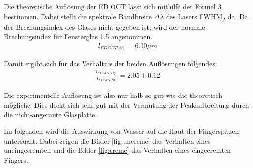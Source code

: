\documentclass[german, %
parskip=full, %
bibliography=totoc, %
]{scrartcl}
\begin{document}
Die theoretische Auflösung der FD OCT lässt sich mithilfe der Formel 3 bestimmen. Dabei stellt die spektrale Bandbreite $\Delta \lambda$ des Lasers FWHM\textsubscript{$\lambda$} da. Da der Brechungsindex des Glases nicht gegeben ist, wird der normale Brechungsindex für Fensterglas 1.5 angenommen. 
\begin{align*}
l_{FD OCT; th.} = 6.00 \mu m
\end{align*}

Damit ergibt sich für das Verhältnis der beiden Auflösungen folgendes:
\begin{align*}
\frac{l_{FD OCT; exp.}}{l_{FD OCT; th.}} = 2.05 \pm 0.12
\end{align*}

Die experimentelle Auflösung ist also nur halb so gut wie die theoretisch mögliche. Dies deckt sich sehr gut mit der Vermutung der Peakaufbreitung durch die nicht-angeraute Glasplatte. 

Im folgenden wird die Auswirkung von Wasser auf die Haut der Fingerspitzen untersucht. Dabei zeigen die Bilder \ref{fig:uncreme} das Verhalten eines uneingecremten und die Bilder \ref{fig:creme} das Verhalten eines eingecremten Fingers. 
\end{document}
